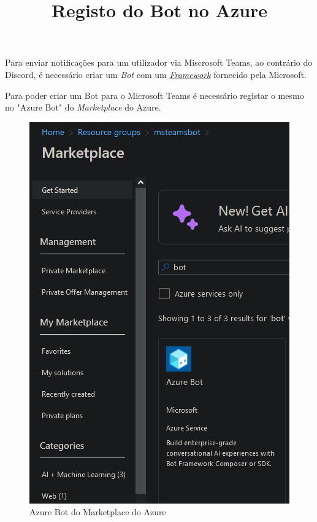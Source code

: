 Para enviar notificações para um utilizador via Miscrosoft Teams, ao contrário do Discord,
é necessário criar um \textit{Bot} com um \href{https://learn.microsoft.com/en-us/azure/bot-service/bot-service-overview?view=azure-bot-service-4.0}{\textit{Framework}}
fornecido pela Microsoft. \\



\title*{\textbf{Registo do Bot no Azure}}

Para poder criar um Bot para o Microsoft Teams é necessário registar o mesmo 
no "Azure Bot" do \textit{Marketplace} do Azure.

\begin{figure}[H]
\begin{center}
\includegraphics[width=14cm]{figs/marketplace azure bot.png}
\caption{Azure Bot do Marketplace do Azure}
\label{fig:bookstack}
\end{center}
\end{figure}

